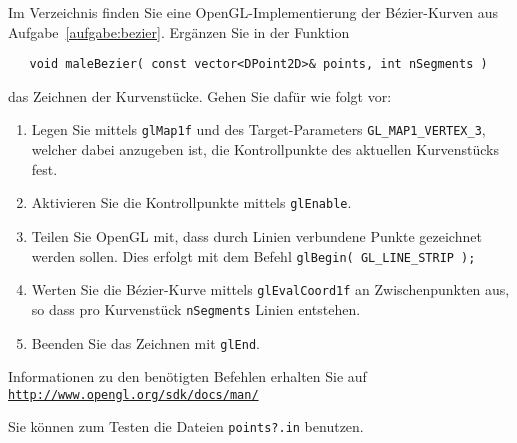 %
Im Verzeichnis  finden Sie eine 
OpenGL-Implementierung der Bézier-Kurven 
aus Aufgabe~\ref{aufgabe:bezier}. Ergänzen Sie in der Funktion
\begin{verbatim}
   void maleBezier( const vector<DPoint2D>& points, int nSegments )
\end{verbatim}
das Zeichnen der Kurvenstücke. Gehen Sie dafür wie folgt vor:
\begin{enumerate}
  \item Legen Sie mittels \texttt{glMap1f} und des Target-Parameters 
        \texttt{GL\_MAP1\_VERTEX\_3}, welcher dabei anzugeben ist, die 
        Kontrollpunkte des aktuellen Kurvenstücks fest.
  \item Aktivieren Sie die Kontrollpunkte mittels \texttt{glEnable}.
  \item Teilen Sie OpenGL mit, dass durch Linien verbundene Punkte
        gezeichnet werden sollen. Dies erfolgt mit dem Befehl 
        \texttt{glBegin( GL\_LINE\_STRIP );}
  \item Werten Sie die Bézier-Kurve mittels \texttt{glEvalCoord1f} an 
        Zwischenpunkten aus, so dass pro Kurvenstück \texttt{nSegments} 
        Linien entstehen.
  \item Beenden Sie das Zeichnen mit \texttt{glEnd}.
\end{enumerate}

Informationen zu den benötigten Befehlen erhalten Sie auf\\
\href{http://www.opengl.org/sdk/docs/man/}{\texttt{http://www.opengl.org/sdk/docs/man/}}

Sie können zum Testen die Dateien \texttt{points?.in} benutzen.

